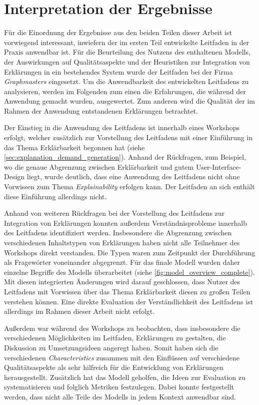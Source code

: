 \section{Interpretation der Ergebnisse}

Für die Einordnung der Ergebnisse aus den beiden Teilen dieser Arbeit ist vorwiegend interessant, inwiefern der im ersten Teil entwickelte Leitfaden in der Praxis anwendbar ist. Für die Beurteilung des Nutzens des enthaltenen Modells, der Auswirkungen auf Qualitätsaspekte und der Heuristiken zur Integration von Erklärungen in ein bestehendes System wurde der Leitfaden bei der Firma \textit{Graphmasters} eingesetzt. Um die Anwendbarkeit des entwickelten Leitfadens zu analysieren, werden im Folgenden zum einen die Erfahrungen, die während der Anwendung gemacht wurden, ausgewertet. Zum anderen wird die Qualität der im Rahmen der Anwendung entstandenen Erklärungen betrachtet.

Der Einstieg in die Anwendung des Leitfadens ist innerhalb eines Workshops erfolgt, welcher zusätzlich zur Vorstellung des Leitfadens mit einer Einführung in das Thema Erklärbarkeit begonnen hat (siehe \autoref{sec:explanation_demand_generation}). Anhand der Rückfragen, zum Beispiel, wo die genaue Abgrenzung zwischen Erklärbarkeit und gutem User-Interface-Design liegt, wurde deutlich, dass eine Anwendung des Leitfadens nicht ohne Vorwissen zum Thema \textit{Explainability} erfolgen kann. Der Leitfaden an sich enthält diese Einführung allerdings nicht.

Anhand von weiteren Rückfragen bei der Vorstellung des Leitfadens zur Integration von Erklärungen konnten außerdem Verständnisprobleme innerhalb des Leitfadens identifiziert werden. Insbesondere die Abgrenzung zwischen verschiedenen Inhaltstypen von Erklärungen haben nicht alle Teilnehmer des Workshops direkt verstanden. Die Typen waren zum Zeitpunkt der Durchführung als Fragewörter voneinander abgegrenzt. Für das finale Modell wurden daher einzelne Begriffe des Modells überarbeitet (siehe \autoref{fig:model_overview_complete}). Mit diesen integrierten Änderungen wird darauf geschlossen, dass Nutzer des Leitfadens mit Vorwissen über das Thema Erklärbarkeit diesen zu großen Teilen verstehen können. Eine direkte Evaluation der Verständlichkeit des Leitfadens ist allerdings im Rahmen dieser Arbeit nicht erfolgt.

Außerdem war während des Workshops zu beobachten, dass insbesondere die verschiedenen Möglichkeiten im Leitfaden, Erklärungen zu gestalten, die Diskussion zu Umsetzungsideen angeregt haben. Somit haben sich die verschiedenen \textit{Characteristics} zusammen mit den Einflüssen auf verschiedene Qualitätsaspekte als sehr hilfreich für die Entwicklung von Erklärungen herausgestellt. Zusätzlich hat das Modell geholfen, die Ideen zur Evaluation zu systematisieren und folglich Metriken festzulegen. Dabei konnte festgestellt werden, dass nicht alle Teile des Modells in jedem Kontext anwendbar sind.

